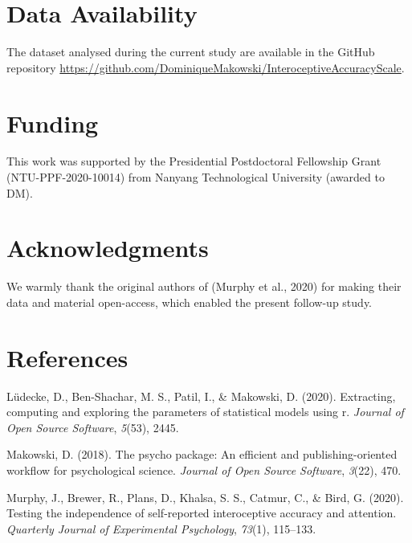 \documentclass[
  man,floatsintext]{apa6}
\newlength{\cslhangindent}
\newlength{\cslentryspacingunit} %
\newenvironment{CSLReferences}[2] %
 {%
  \setlength{\parindent}{0pt}
  \ifodd #1
  \let\oldpar\par
  \def\par{\hangindent=\cslhangindent\oldpar}
  \fi
  \setlength{\parskip}{#2\cslentryspacingunit}
 }%
 {}
\begin{document}
\newpage

\hypertarget{data-availability}{%
\section{Data Availability}\label{data-availability}}

The dataset analysed during the current study are available in the GitHub repository \url{https://github.com/DominiqueMakowski/InteroceptiveAccuracyScale}.

\hypertarget{funding}{%
\section{Funding}\label{funding}}

This work was supported by the Presidential Postdoctoral Fellowship Grant (NTU-PPF-2020-10014) from Nanyang Technological University (awarded to DM).

\hypertarget{acknowledgments}{%
\section{Acknowledgments}\label{acknowledgments}}

We warmly thank the original authors of (Murphy et al., 2020) for making their data and material open-access, which enabled the present follow-up study.

\newpage

\hypertarget{references}{%
\section{References}\label{references}}

\hypertarget{refs}{}
\begin{CSLReferences}{1}{0}
\leavevmode{}%
Lüdecke, D., Ben-Shachar, M. S., Patil, I., \& Makowski, D. (2020). Extracting, computing and exploring the parameters of statistical models using r. \emph{Journal of Open Source Software}, \emph{5}(53), 2445.

\leavevmode{}%
Makowski, D. (2018). The psycho package: An efficient and publishing-oriented workflow for psychological science. \emph{Journal of Open Source Software}, \emph{3}(22), 470.

\leavevmode{}%
Murphy, J., Brewer, R., Plans, D., Khalsa, S. S., Catmur, C., \& Bird, G. (2020). Testing the independence of self-reported interoceptive accuracy and attention. \emph{Quarterly Journal of Experimental Psychology}, \emph{73}(1), 115--133.

\end{CSLReferences}


\clearpage
\renewcommand{\listfigurename}{Figure captions}
\end{document}
